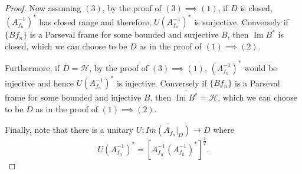 \documentclass[10pt,a4paper]{amsart}
\newcommand{\Hcal}{\mathcal{H}} %
\begin{document}
\begin{proof}
Now assuming $(3)$, by the proof of $(3)\implies (1)$, if $D$ is closed, $(A^{-1}_{f_n})^{*}$ has closed range and therefore, $U(A^{-1}_{f_n})^{*}$ is surjective. Conversely if $\{Bf_n\}$ is a Parseval frame for some bounded and surjective $B$, then $\operatorname{Im}B^{*}$ is closed, which we can choose to be $D$ as in the proof of $(1)\implies (2)$.

Furthermore, if $\overline{D}=\Hcal$, 
by the proof of $(3)\implies (1)$, $(A_{f_n}^{-1})^{*}$ would be injective and hence $U(A^{-1}_{f_n})^{*}$ is injective. Conversely if $\{Bf_n\}$ is a Parseval frame for some bounded and injective $B$, then $\overline{\operatorname{Im}B^{*}}=\Hcal$, which we can choose to be $D$ as in the proof of $(1)\implies (2)$.

Finally, note that there is a unitary $U: \overline{Im(A_{f_n}|_{D})}\to \overline{D}$ where $$U(A_{f_n}^{-1})^{*}=[A_{f_n}^{-1}(A_{f_n}^{-1})^{*}]^{\frac{1}{2}}.$$
\end{proof}
\end{document}
